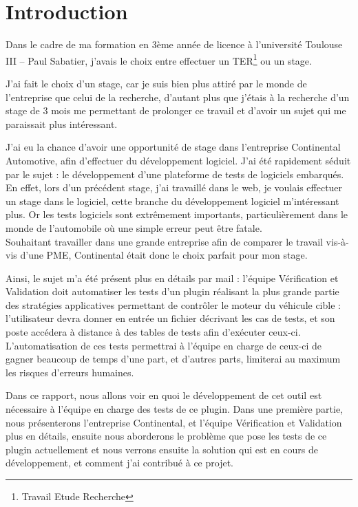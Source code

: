 \chapter*{Introduction}
	Dans le cadre de ma formation en 3ème année de licence à l'université Toulouse III -- Paul Sabatier, j'avais le choix entre effectuer un TER\footnote{Travail Etude Recherche} ou un stage.

	J'ai fait le choix d'un stage, car je suis bien plus attiré par le monde de l'entreprise que celui de la recherche, d'autant plus que j'étais à la recherche d'un stage de 3 mois me permettant de prolonger ce travail et d'avoir un sujet qui me paraissait plus intéressant.

	J'ai eu la chance d'avoir une opportunité de stage dans l'entreprise Continental Automotive, afin d'effectuer du développement logiciel. J'ai été rapidement
	séduit par le sujet : le développement d'une plateforme de tests de logiciels embarqués. En effet, lors d'un précédent stage, j'ai travaillé dans le web, je voulais effectuer un stage dans le logiciel, cette branche du développement logiciel m'intéressant plus. Or les tests logiciels sont extrêmement importants, particulièrement dans le monde de l'automobile où une simple erreur peut être fatale.\\
	Souhaitant travailler dans une grande entreprise afin de comparer le travail vis-à-vis d'une PME, Continental était donc le choix parfait pour mon stage.

	Ainsi, le sujet m'a été présent plus en détails par mail : l'équipe Vérification et Validation doit automatiser les tests d'un plugin réalisant la plus grande partie des stratégies applicatives permettant de contrôler le moteur du véhicule cible : l'utilisateur devra donner en entrée un fichier décrivant les cas de tests, et son poste accédera à distance à des tables de tests afin d'exécuter ceux-ci.\\
	L'automatisation de ces tests permettrai à l'équipe en charge de ceux-ci de gagner beaucoup de temps d'une part, et d'autres parts, limiterai au maximum les risques d'erreurs humaines.

	Dans ce rapport, nous allons voir en quoi le développement de cet outil est nécessaire à l'équipe en charge des tests de ce plugin. Dans une première partie, nous présenterons l'entreprise Continental, et l'équipe Vérification et Validation plus en détails, ensuite nous aborderons le problème que pose les tests de ce plugin actuellement et nous verrons ensuite la solution qui est en cours de développement, et comment j'ai contribué à ce projet.
